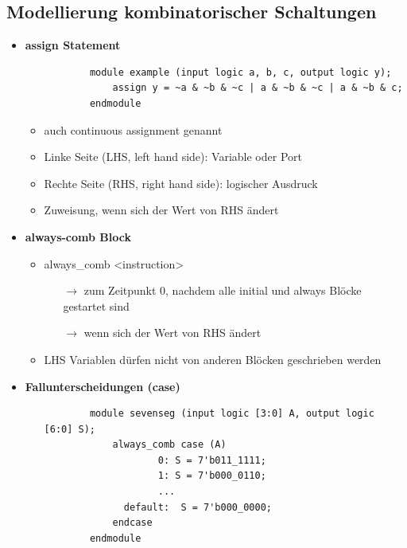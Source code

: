 \documentclass[11pt,a4paper]{article}
\begin{document}
\subsection{Modellierung kombinatorischer Schaltungen}
\begin{itemize}

\item \textbf{assign Statement}
	\begin{itemize}
	\item[]
		\begin{lstlisting}
		module example (input logic a, b, c, output logic y);
			assign y = ~a & ~b & ~c | a & ~b & ~c | a & ~b & c;
		endmodule
		\end{lstlisting}
	\item auch continuous assignment genannt
	\item Linke Seite (LHS, left hand side): Variable oder Port
	\item Rechte Seite (RHS, right hand side): logischer Ausdruck
	\item Zuweisung, wenn sich der Wert von RHS ändert
	\end{itemize}
	
\item \textbf{always-comb Block}
	\begin{itemize}
	\item always\_comb <instruction>
		\begin{itemize}
		\item[$\rightarrow$] zum Zeitpunkt 0, nachdem alle initial und always Blöcke gestartet sind
		\item[$\rightarrow$] wenn sich der Wert von RHS ändert
		\end{itemize}
		
	\item LHS Variablen dürfen nicht von anderen Blöcken geschrieben werden
	\end{itemize}

\pagebreak

\item \textbf{Fallunterscheidungen (case)}
	\begin{itemize}
	\item[]
		\begin{lstlisting}
		module sevenseg (input logic [3:0] A, output logic [6:0] S);
			always_comb case (A)
					0: S = 7'b011_1111;
					1: S = 7'b000_0110;
					...
			  default: 	S = 7'b000_0000;
			endcase
		endmodule
		\end{lstlisting}
		

\end{itemize}
\end{itemize}
\end{document}

